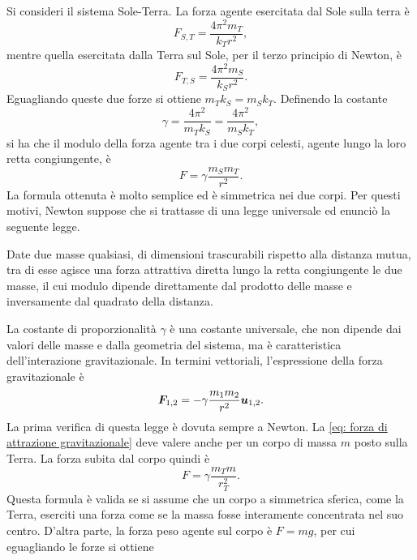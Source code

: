 Si consideri il sistema Sole-Terra. La forza agente esercitata dal Sole sulla terra è
\begin{equation}
    F_{S,T}=\frac{4\pi^2m_T}{k_Tr^2},
\end{equation}
mentre quella esercitata dalla Terra sul Sole, per il terzo principio di Newton, è
\begin{equation}
    F_{T,S}=\frac{4\pi^2m_S}{k_Sr^2}.
\end{equation}
Eguagliando queste due forze si ottiene $m_Tk_S=m_Sk_T$. Definendo la costante
\begin{equation}
    \gamma=\frac{4\pi^2}{m_Tk_S}=\frac{4\pi^2}{m_Sk_T},
\end{equation}
si ha che il modulo della forza agente tra i due corpi celesti, agente lungo la loro retta congiungente, è
\begin{equation}
    F=\gamma\frac{m_Sm_T}{r^2}.
\end{equation}
La formula ottenuta è molto semplice ed è simmetrica nei due corpi. Per questi motivi, Newton suppose che si trattasse di una legge universale ed enunciò la seguente legge.
\begin{axiom}
    Date due masse qualsiasi, di dimensioni trascurabili rispetto alla distanza mutua, tra di esse agisce una forza attrattiva diretta lungo la retta congiungente le due masse, il cui modulo dipende direttamente dal prodotto delle masse e inversamente dal quadrato della distanza.
\end{axiom}
La costante di proporzionalità $\gamma$ è una costante universale, che non dipende dai valori delle masse e dalla geometria del sistema, ma è caratteristica dell'interazione gravitazionale. In termini vettoriali, l'espressione della forza gravitazionale è
\begin{equation}
\label{eq: forza di attrazione gravitazionale}
    \bm{F}_{1,2}=-\gamma\frac{m_1m_2}{r^2}\bm{u}_{1,2}.
\end{equation}
La prima verifica di questa legge è dovuta sempre a Newton. La \eqref{eq: forza di attrazione gravitazionale} deve valere anche per un corpo di massa $m$ posto sulla Terra. La forza subita dal corpo quindi è
\begin{equation}
    F=\gamma\frac{m_Tm}{r_T^2}.
\end{equation}
Questa formula è valida se si assume che un corpo a simmetrica sferica, come la Terra, eserciti una forza come se la massa fosse interamente concentrata nel suo centro. D'altra parte, la forza peso agente sul corpo è $F=mg$, per cui eguagliando le forze si ottiene
